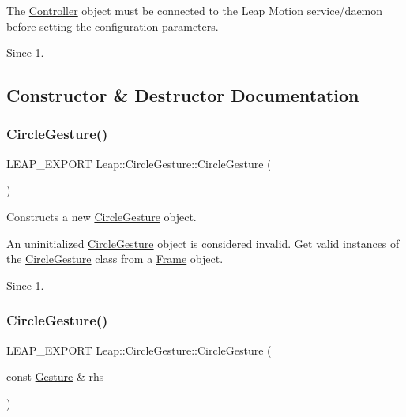 \begin{DoxyCodeInclude}
\end{DoxyCodeInclude}


The \hyperlink{class_leap_1_1_controller}{Controller} object must be connected to the Leap Motion service/daemon before setting the configuration parameters.

\begin{DoxySince}{Since}
1. 
\end{DoxySince}


\subsection{Constructor \& Destructor Documentation}
\mbox{\label{class_leap_1_1_circle_gesture_a67ac2907b68958693129eb7a6f731722}} 
\subsubsection{\texorpdfstring{Circle\+Gesture()}{CircleGesture()}\hspace{0.1cm}{\footnotesize\ttfamily [1/2]}}
{\footnotesize\ttfamily L\+E\+A\+P\+\_\+\+E\+X\+P\+O\+RT Leap\+::\+Circle\+Gesture\+::\+Circle\+Gesture (\begin{DoxyParamCaption}{ }\end{DoxyParamCaption})}

Constructs a new \hyperlink{class_leap_1_1_circle_gesture}{Circle\+Gesture} object.

An uninitialized \hyperlink{class_leap_1_1_circle_gesture}{Circle\+Gesture} object is considered invalid. Get valid instances of the \hyperlink{class_leap_1_1_circle_gesture}{Circle\+Gesture} class from a \hyperlink{class_leap_1_1_frame}{Frame} object. \begin{DoxySince}{Since}
1. 
\end{DoxySince}
\mbox{\label{class_leap_1_1_circle_gesture_a3a27444e1657e1ecf3e74bc9c7cad292}} 
\subsubsection{\texorpdfstring{Circle\+Gesture()}{CircleGesture()}\hspace{0.1cm}{\footnotesize\ttfamily [2/2]}}
{\footnotesize\ttfamily L\+E\+A\+P\+\_\+\+E\+X\+P\+O\+RT Leap\+::\+Circle\+Gesture\+::\+Circle\+Gesture (\begin{DoxyParamCaption}\item[{const \hyperlink{class_leap_1_1_gesture}{Gesture} \&}]{rhs }\end{DoxyParamCaption})}

